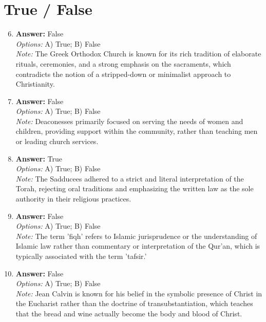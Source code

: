 \documentclass[12pt]{article}
\begin{document}
\section*{True / False}
\begin{enumerate}[label=\arabic*.]
\setcounter{enumi}{5}
\item \textbf{Answer:} False
\\ \textit{Options:} A) True; B) False
\\ \textit{Note:} The Greek Orthodox Church is known for its rich tradition of elaborate rituals, ceremonies, and a strong emphasis on the sacraments, which contradicts the notion of a stripped-down or minimalist approach to Christianity.
\item \textbf{Answer:} False
\\ \textit{Options:} A) True; B) False
\\ \textit{Note:} Deaconesses primarily focused on serving the needs of women and children, providing support within the community, rather than teaching men or leading church services.
\item \textbf{Answer:} True
\\ \textit{Options:} A) True; B) False
\\ \textit{Note:} The Sadducees adhered to a strict and literal interpretation of the Torah, rejecting oral traditions and emphasizing the written law as the sole authority in their religious practices.
\item \textbf{Answer:} False
\\ \textit{Options:} A) True; B) False
\\ \textit{Note:} The term 'fiqh' refers to Islamic jurisprudence or the understanding of Islamic law rather than commentary or interpretation of the Qur'an, which is typically associated with the term 'tafsir.'
\item \textbf{Answer:} False
\\ \textit{Options:} A) True; B) False
\\ \textit{Note:} Jean Calvin is known for his belief in the symbolic presence of Christ in the Eucharist rather than the doctrine of transubstantiation, which teaches that the bread and wine actually become the body and blood of Christ.
\end{enumerate}
\end{document}
